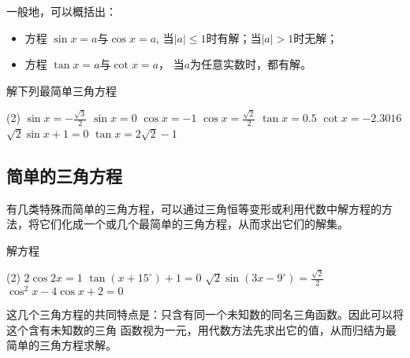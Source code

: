 一般地，可以概括出：
\begin{itemize}
    \item 方程 $\sin x=a$与$\cos x=a$, 当$|a|\le 1$时有解；当$|a|>1$时无解；
    \item 方程 $\tan x=a$与$\cot x=a$， 当$a$为任意实数时，都有解。
\end{itemize}

\begin{ex}
    解下列最简单三角方程
\begin{tasks}(2)
    \task $\sin x=-\frac{\sqrt{3}}{2}$
    \task $\sin x=0$
    \task $\cos x=-1$
    \task $\cos x=\frac{\sqrt{2}}{2}$
    \task $\tan x=0.5$
    \task $\cot x=-2.3016$
    \task $\sqrt{2}\sin x+1=0$
    \task $\tan x=2\sqrt{2}-1$
\end{tasks}
\end{ex}

\subsection{简单的三角方程}

有几类特殊而简单的三角方程，可以通过三角恒等变形或利用代数中解方程的方法，将它们化成一个或几个最简单的三角方程，从而求出它们的解集。

\begin{example}
    解方程
\begin{tasks}(2)
\tasks $2\cos2x=1$
\tasks $\tan (x+15^{\circ})+1=0$
\tasks $\sqrt{2}\sin(3x-9^{\circ})=\frac{\sqrt{2}}{2}$
\tasks $\cos^2x-4\cos x+2=0$
\end{tasks}
\end{example}

\begin{analyze}
  这几个三角方程的共同特点是：只含有同一个未知数的同名三角函数。因此可以将这个含有未知数的三角  
  函数视为一元，用代数方法先求出它的值，从而归结为最简单的三角方程求解。
\end{analyze}

